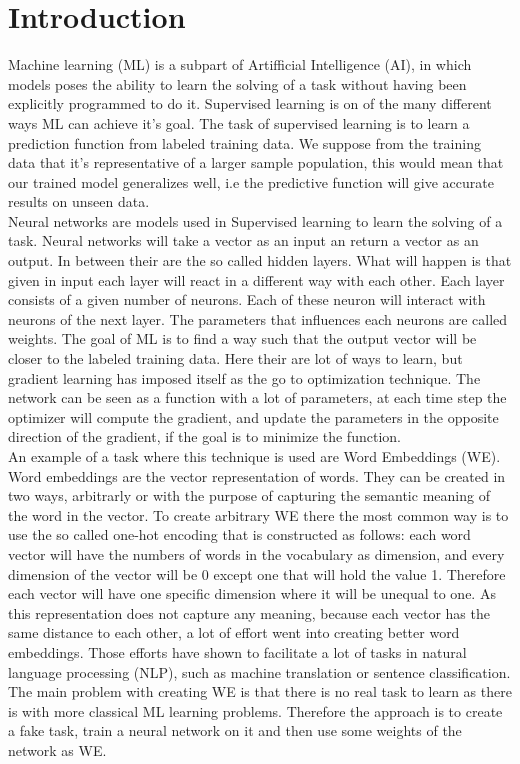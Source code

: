 \chapter{Introduction}\label{chap:introduction}


Machine learning (ML) is a subpart of Artifficial Intelligence (AI), in which models poses the ability to learn the solving of a task without having been explicitly programmed to do it. Supervised learning is on of the many different ways ML can achieve it's goal. The task of supervised learning is to learn a prediction function from labeled training data. We suppose from the training data that it's representative of a larger sample population, this would mean that our trained model generalizes well, i.e the predictive function will give accurate results on unseen data. \\

Neural networks are models used in Supervised learning to learn the solving of a task. Neural networks will take a vector as an input an return a vector as an output. In between their are the so called hidden layers. What will happen is that given in input each layer will react in a different way with each other. Each layer consists of a given number of neurons. Each of these neuron will interact with neurons of the next layer. The parameters that influences each neurons are called weights. The goal of ML is to find a way such that the output vector will be closer to the labeled training data. Here their are lot of ways to learn, but gradient learning has imposed itself as the go to optimization technique. The network can be seen as a function with a lot of parameters, at each time step the optimizer will compute the gradient, and update the parameters in the opposite direction of the gradient, if the goal is to minimize the function. \\

An example of a task where this technique is used are Word Embeddings (WE). Word embeddings are the vector representation of words. They can be created in two ways, arbitrarly or with the purpose of capturing the semantic meaning of the word in the vector. To create arbitrary WE there the most common way is to use the so called one-hot encoding that is constructed as follows: each word vector will have the numbers of words in the vocabulary as dimension, and every dimension of the vector will be 0 except one that will hold the value 1. Therefore each vector will have one specific dimension where it will be unequal to one. As this representation does not capture any meaning, because each vector has the same distance to each other, a lot of effort went into  creating better word embeddings. Those efforts have shown to facilitate a lot of tasks in natural language processing (NLP), such as machine translation or sentence classification. The main problem with creating WE is that there is no real task to learn as there is with more classical ML learning problems. Therefore the approach is to create a fake task, train a neural network on it and then use some weights of the network as WE. \\

